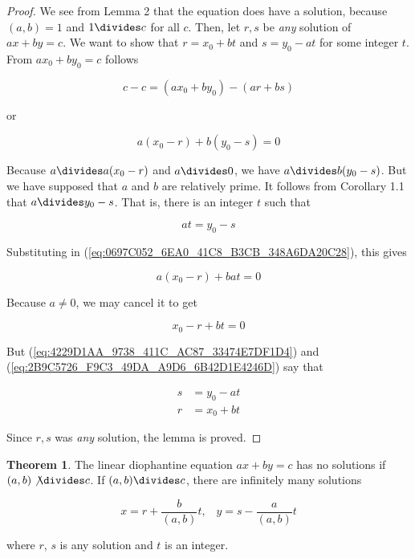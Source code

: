 \documentclass{article}
\theoremstyle{definition} %
\newtheorem{theorem}{Theorem}[section] %
\theoremstyle{definition}
\theoremstyle{definition}
\theoremstyle{definition}
\begin{document}
  \begin{proof}
    We see from Lemma 2 that the equation does have a solution, because $(a, b) = 1$ and $1 \divides c$ for all
    $c$. Then, let $r, s$ be \textit{any} solution of $ax + by = c$. We want to show that $r = x_0 + bt$ and
    $s = y_0 - at$ for some integer $t$. From $ax_0 + by_0 = c$ follows
    
    \begin{equation*}
      c - c = (ax_0 + by_0) - (ar + bs)
    \end{equation*}
    
    or
    
    \begin{equation}
      a(x_0 - r) + b(y_0 - s) = 0
      \label{eq:0697C052_6EA0_41C8_B3CB_348A6DA20C28}
    \end{equation}
    
    Because $a \divides a(x_0 - r)$ and $a \divides 0$, we have $a \divides b(y_0 - s)$. But we have supposed that
    $a$ and $b$ are relatively prime. It follows from Corollary 1.1 that $a \divides y_0 - s$. That is, there is an integer
    $t$ such that
    
    \begin{equation}
      at = y_0 - s
      \label{eq:4229D1AA_9738_411C_AC87_33474E7DF1D4}
    \end{equation}
    
    Substituting in (\ref{eq:0697C052_6EA0_41C8_B3CB_348A6DA20C28}), this gives
    
    \begin{equation*}
      a(x_0 - r) + bat = 0
    \end{equation*}
    
    Because $a \neq 0$, we may cancel it to get
    
    \begin{equation}
      x_0 - r + bt = 0
      \label{eq:2B9C5726_F9C3_49DA_A9D6_6B42D1E4246D}
    \end{equation}
    
    But (\ref{eq:4229D1AA_9738_411C_AC87_33474E7DF1D4}) and (\ref{eq:2B9C5726_F9C3_49DA_A9D6_6B42D1E4246D}) say that
    
    \begin{align*}
      s &= y_0 - at \\
      r &= x_0 + bt
    \end{align*}
    
    Since $r, s$ was \textit{any} solution, the lemma is proved.
  \end{proof}
  
  \begin{theorem}
    The linear diophantine equation $ax + by = c$ has no solutions if $(a, b) \not\divides c$. If $(a, b) \divides c$, there are
    infinitely many solutions
    
    \begin{equation*}
      x = r + \frac{b}{(a, b)}t,\;\;\;y = s - \frac{a}{(a, b)}t
    \end{equation*}
    
    where $r$, $s$ is any solution and $t$ is an integer.
  \end{theorem}
  
\end{document}
